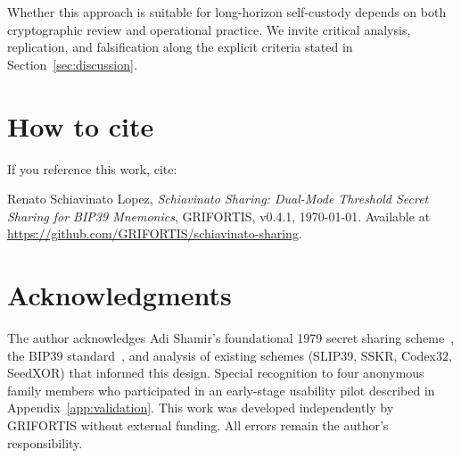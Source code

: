 \documentclass[11pt]{article}
\newcommand{\SchiavinatoSharingVersion}{v0.4.1}
\begin{document}
Whether this approach is suitable for long-horizon self-custody depends on both cryptographic review and operational practice. We invite critical analysis, replication, and falsification along the explicit criteria stated in Section~\ref{sec:discussion}.

\section*{How to cite}

If you reference this work, cite:

Renato Schiavinato Lopez, \textit{Schiavinato Sharing: Dual-Mode Threshold Secret Sharing for BIP39 Mnemonics}, GRIFORTIS, \SchiavinatoSharingVersion, \today. Available at \url{https://github.com/GRIFORTIS/schiavinato-sharing}.

\section*{Acknowledgments}

The author acknowledges Adi Shamir's foundational 1979 secret sharing scheme~\cite{shamir1979}, the BIP39 standard~\cite{bip39}, and analysis of existing schemes (SLIP39, SSKR, Codex32, SeedXOR) that informed this design. Special recognition to four anonymous family members who participated in an early-stage usability pilot described in Appendix~\ref{app:validation}. This work was developed independently by GRIFORTIS without external funding. All errors remain the author's responsibility.
\end{document}
